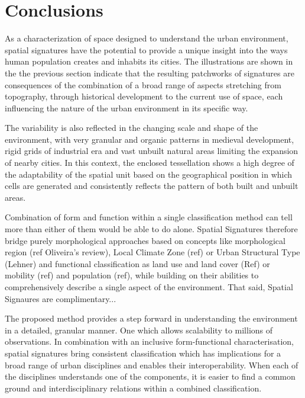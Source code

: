 \section{Conclusions}
\label{sec:conclusions}

As a characterization of space designed to understand the urban environment,
spatial signatures have the potential to provide a unique insight into the ways
human population creates and inhabits its cities. The illustrations are shown in the
the previous section indicate that the resulting patchworks of signatures are consequences
of the combination of a broad range of aspects stretching from topography, through
historical development to the current use of space, each influencing the nature of
the urban environment in its specific way.

The variability is also reflected in the changing scale and shape of the environment,
with very granular and organic patterns in medieval development, rigid grids of
industrial era and vast unbuilt natural areas limiting the expansion of nearby
cities. In this context, the enclosed tessellation shows a high degree of
the adaptability of the spatial unit based on the geographical position in which
cells are generated and consistently reflects the pattern of both built and
unbuilt areas.

Combination of form and function within a single classification method can tell
more than either of them would be able to do alone. Spatial Signatures therefore
bridge purely morphological approaches based on concepts like morphological
region (ref Oliveira's review), Local Climate Zone (ref) or Urban Structural
Type (Lehner) and functional classification as land use and land cover (Ref) or
mobility (ref) and population (ref), while building on their abilities to
comprehensively describe a single aspect of the environment.
That said, Spatial Signaures are complimentary... 

The proposed method provides a step forward in understanding the environment in
a detailed, granular manner. One which allows scalability to millions of
observations. In combination with an inclusive form-functional characterisation,
spatial signatures bring consistent classification which has implications for a
broad range of urban disciplines and enables their interoperability. When each of
the disciplines understands one of the components, it is easier to find a common
ground and interdisciplinary relations within a combined classification.

